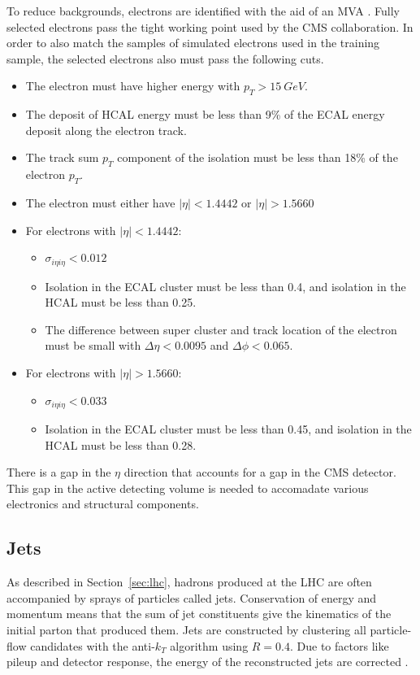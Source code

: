 To reduce backgrounds, electrons are identified with the aid of an MVA \cite{Rembser_2019}.
Fully selected electrons pass the tight working point used by the CMS collaboration.
In order to also match the samples of simulated electrons used in the training sample,
the selected electrons also must pass the following cuts.
\begin{itemize}
\item The electron must have higher energy with $p_T > \SI{15}{GeV}$.
\item The deposit of HCAL energy must be less than 9\% of the ECAL energy deposit
  along the electron track.
\item The track sum $p_T$ component of the isolation must be
  less than 18\% of the electron $p_T$.
\item The electron must either have $|\eta| < 1.4442$ or $|\eta| > 1.5660$
\item For electrons with $|\eta| < 1.4442$:
  \begin{itemize}
  \item $\sigma_{i\eta i\eta} < 0.012$
  \item Isolation in the ECAL cluster must be less than 0.4,
    and isolation in the HCAL must be less than 0.25.
  \item The difference between super cluster and track location of the electron
    must be small with $\Delta \eta < 0.0095$ and $\Delta \phi < 0.065$.
  \end{itemize}
\item For electrons with $|\eta| > 1.5660$:
  \begin{itemize}
  \item $\sigma_{i\eta i\eta} < 0.033$
  \item Isolation in the ECAL cluster must be less than 0.45,
    and isolation in the HCAL must be less than 0.28.
  \end{itemize}
\end{itemize}
There is a gap in the $\eta$ direction that accounts for a gap in the CMS detector.
This gap in the active detecting volume is needed to
accomadate various electronics and structural components.

\subsection{Jets}

As described in Section~\ref{sec:lhc},
hadrons produced at the LHC are often accompanied by sprays of particles called jets.
Conservation of energy and momentum means that the sum of jet constituents
give the kinematics of the initial parton that produced them.
Jets are constructed by clustering all particle-flow candidates
with the anti-$k_T$ algorithm \cite{Cacciari_2008} using $R = 0.4$.
Due to factors like pileup and detector response,
the energy of the reconstructed jets are corrected \cite{Khachatryan_2017}.

